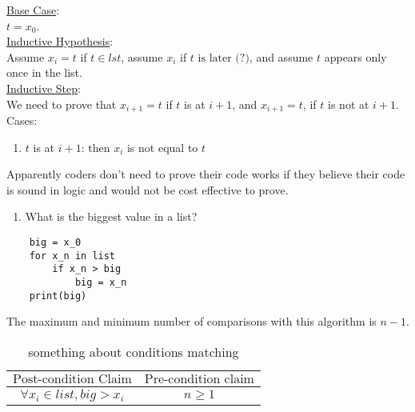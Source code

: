 \documentclass{article}
\begin{document}
    \underline{Base Case}: \\
    $t = x_0$.\\

    \underline{Inductive Hypothesis}: \\
    Assume $x_i = t$ if $t \in lst$, assume $x_i$ if $t \text{ is later (?)}$, and assume $t$ appears only once in the list. \\

    \underline{Inductive Step}: \\
    We need to prove that $x_{i + 1} = t$ if $t$ is at $i + 1$, and $x_{i + 1} = t$, if $t$ is not at $i + 1$. \\
    Cases: \begin{enumerate}
        \item $t$ is at $i + 1$: then $x_i$ is not equal to $t$
    \end{enumerate}

    \begin{yap}
        Apparently coders don't need to prove their code works if they believe their code is sound in logic and would not be cost effective to prove.
    \end{yap}

    \begin{enumerate}
        \item What is the biggest value in a list?
    \end{enumerate}

    \begin{lstlisting}
    big = x_0
    for x_n in list
        if x_n > big
            big = x_n
    print(big)
    \end{lstlisting}

    The maximum and minimum number of comparisons with this algorithm is $n-1$. \\

    \begin{table}[ht]
            \centering
            \begin{tabular}{c|c}
                $\text{Post-condition Claim}$ & $\text{Pre-condition claim}$ \\
                \hline
                $\forall x_i \in list, big > x_i$ & $n \geq 1$ \\
            \end{tabular}
            \caption{something about conditions matching}
            \label{Bottom Up A(n)}
    \end{table}
\end{document}
